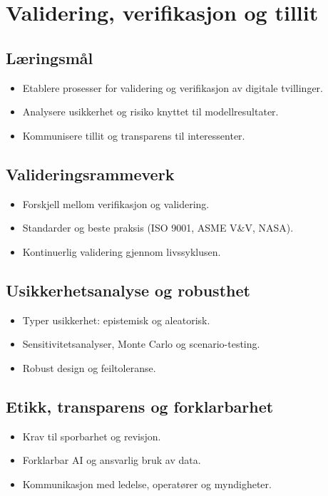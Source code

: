 \chapter{Validering, verifikasjon og tillit}

\section{Læringsmål}
\begin{itemize}
    \item Etablere prosesser for validering og verifikasjon av digitale tvillinger.
    \item Analysere usikkerhet og risiko knyttet til modellresultater.
    \item Kommunisere tillit og transparens til interessenter.
\end{itemize}

\section{Valideringsrammeverk}
\begin{itemize}
    \item Forskjell mellom verifikasjon og validering.
    \item Standarder og beste praksis (ISO 9001, ASME V\&V, NASA).
    \item Kontinuerlig validering gjennom livssyklusen.
\end{itemize}

\section{Usikkerhetsanalyse og robusthet}
\begin{itemize}
    \item Typer usikkerhet: epistemisk og aleatorisk.
    \item Sensitivitetsanalyser, Monte Carlo og scenario-testing.
    \item Robust design og feiltoleranse.
\end{itemize}

\section{Etikk, transparens og forklarbarhet}
\begin{itemize}
    \item Krav til sporbarhet og revisjon.
    \item Forklarbar AI og ansvarlig bruk av data.
    \item Kommunikasjon med ledelse, operatører og myndigheter.
\end{itemize}

